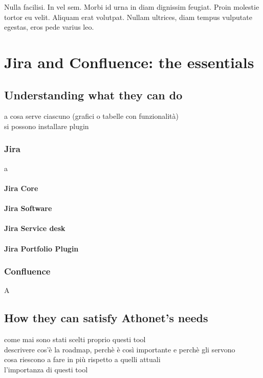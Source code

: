 \begin{savequote}[75mm]
Nulla facilisi. In vel sem. Morbi id urna in diam dignissim feugiat. Proin molestie tortor eu velit. Aliquam erat volutpat. Nullam ultrices, diam tempus vulputate egestas, eros pede varius leo.
\end{savequote}

\chapter{Jira and Confluence: the essentials}


\section{Understanding what they can do}
a cosa serve ciascuno (grafici o tabelle con funzionalità)\\
si possono installare plugin

	\subsection{Jira}
	
		a
	
		\subsubsection{Jira Core}
		\subsubsection{Jira Software}
		\subsubsection{Jira Service desk}

		\subsubsection{Jira Portfolio Plugin}
	
	\subsection{Confluence}
		A

\section{How they can satisfy Athonet's needs}
come mai sono stati scelti proprio questi tool\\
descrivere cos'è la roadmap, perchè è così importante e perchè gli servono\\
cosa riescono a fare in più rispetto a quelli attuali\\
l'importanza di questi tool

